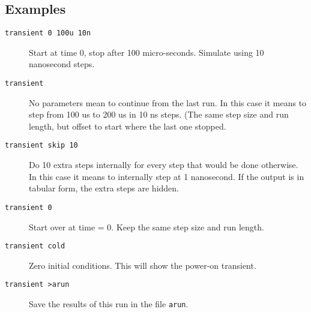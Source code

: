 \subsection{Examples}

\begin{description}

\item[{\tt transient 0 100u 10n}] Start at time 0, stop after
100 micro-seconds.  Simulate using 10 nanosecond steps.

\item[{\tt transient}] No parameters mean to continue from the last run.  In
this case it means to step from 100 us to 200 us in 10 ns steps.  (The same
step size and run length, but offset to start where the last one stopped.

\item[{\tt transient skip 10}] Do 10 extra steps internally for every step
that would be done otherwise.  In this case it means to internally step at 1
nanosecond.  If the output is in tabular form, the extra steps are hidden.

\item[{\tt transient 0}] Start over at time = 0.  Keep the same
step size and run length.

\item[{\tt transient cold}] Zero initial conditions.  This will
show the power-on transient.

\item[{\tt transient >arun}] Save the results of this run in
the file {\tt arun}.


\end{description}
